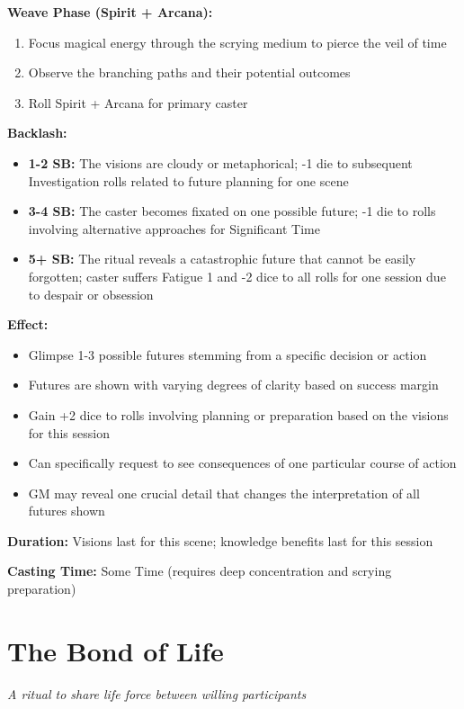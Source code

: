 \textbf{Weave Phase (Spirit + Arcana):}
\begin{enumerate}
\item Focus magical energy through the scrying medium to pierce the veil of time
\item Observe the branching paths and their potential outcomes
\item Roll Spirit + Arcana for primary caster
\end{enumerate}

\textbf{Backlash:}
\begin{itemize}
\item \textbf{1-2 SB:} The visions are cloudy or metaphorical; -1 die to subsequent Investigation rolls related to future planning for one scene
\item \textbf{3-4 SB:} The caster becomes fixated on one possible future; -1 die to rolls involving alternative approaches for Significant Time
\item \textbf{5+ SB:} The ritual reveals a catastrophic future that cannot be easily forgotten; caster suffers Fatigue 1 and -2 dice to all rolls for one session due to despair or obsession
\end{itemize}

\textbf{Effect:}
\begin{itemize}
\item Glimpse 1-3 possible futures stemming from a specific decision or action
\item Futures are shown with varying degrees of clarity based on success margin
\item Gain +2 dice to rolls involving planning or preparation based on the visions for this session
\item Can specifically request to see consequences of one particular course of action
\item GM may reveal one crucial detail that changes the interpretation of all futures shown
\end{itemize}

\textbf{Duration:} Visions last for this scene; knowledge benefits last for this session

\textbf{Casting Time:} Some Time (requires deep concentration and scrying preparation)

\section*{The Bond of Life}
\textit{A ritual to share life force between willing participants}

